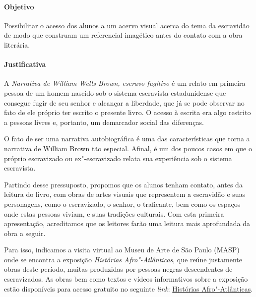 \documentclass[12pt]{extarticle}
\begin{document}
 \paragraph{Objetivo} Possibilitar o acesso dos alunos a um acervo
 visual acerca do tema da escravidão de modo que construam um referencial
 imagético antes do contato com a obra literária. 

 \paragraph{Justificativa} A \emph{Narrativa de William Wells Brown, escravo fugitivo}
 é um relato em primeira pessoa de um homem nascido sob o sistema escravista
 estadunidense que consegue fugir de seu senhor e alcançar a liberdade, que já 
 se pode observar no fato de ele próprio ter escrito o presente livro. O acesso
 à escrita era algo restrito a pessoas livres e, portanto, um demarcador
 social das diferenças. 

 O fato de ser uma narrativa autobiográfica é uma das características que torna
 a narrativa de William Brown tão especial. Afinal, é um dos poucos casos
 em que o próprio escravizado ou ex"-escravizado relata sua experiência 
 sob o sistema escravista. 

 Partindo desse pressuposto, propomos que os alunos tenham contato, antes 
 da leitura do livro, com obras de artes visuais que representem 
 a escravidão e suas personagens, como o escravizado, o senhor, o traficante,
 bem como os espaços onde estas pessoas viviam, e suas tradições culturais. 
 Com esta primeira apresentação, acreditamos que os leitores farão uma leitura
 mais aprofundada da obra a seguir. 

 Para isso, indicamos a visita virtual ao Museu de Arte de São Paulo (MASP)
 onde se encontra a exposição \emph{Histórias Afro"-Atlânticas}, que reúne
 justamente obras deste período, muitas produzidas por pessoas negras
 descendentes de escravizados. As obras bem como textos e vídeos informativos sobre a 
 exposição estão disponíveis para acesso gratuito no seguinte \emph{link}:
 \href{https://masp.org.br/exposicoes/historias-afro-atlanticas}{Histórias Afro"-Atlânticas}. 
\end{document}
